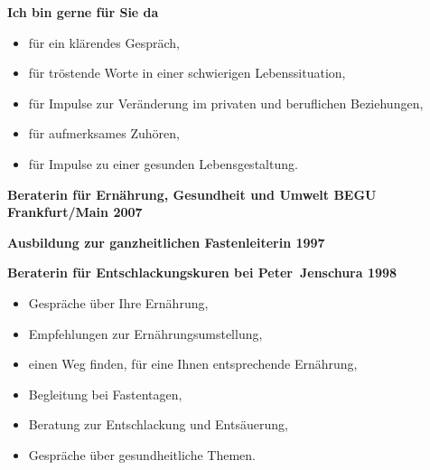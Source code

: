 \documentclass[10pt,foldmark,notumble]{leaflet}
\begin{document}
\vspace{2mm}
\begin{flushleft}
{\bf Ich bin gerne für Sie da}\\
\begin{itemize}
\item  für ein klärendes Gespräch,
\item  für tröstende Worte in einer schwierigen Lebenssituation,
\item  für Impulse zur Veränderung im privaten und beruflichen Beziehungen,
\item  für aufmerksames Zuhören,
\item  für Impulse zu einer gesunden Lebensgestaltung.
\end{itemize}

\vspace{4mm}

{\bf Beraterin für Ernährung, Gesundheit und Umwelt BEGU Frankfurt/Main 2007}\\

\vspace{4mm}

{\bf Ausbildung zur ganzheitlichen Fastenleiterin 1997}\\

\vspace{4mm}

{\bf Beraterin für Entschlackungskuren bei \mbox{Peter Jenschura} 1998}\\
\begin{itemize}
\item  Gespräche über Ihre Ernährung,
\item  Empfehlungen zur Ernährungsumstellung,
\item  einen Weg finden, für eine Ihnen entsprechende Ernährung,
\item  Begleitung bei Fastentagen,
\item  Beratung zur Entschlackung und Entsäuerung,
\item  Gespräche über gesundheitliche Themen.
\end{itemize}
\end{flushleft}



\end{document}
